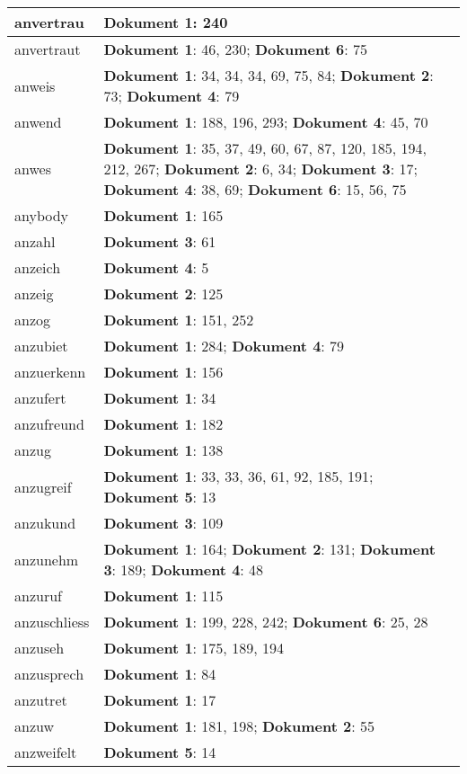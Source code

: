 \documentclass[a5paper]{article}
\begin{document}
\begin{longtable}[l]{|l|p{3in}|}
\hline
anvertrau & \textbf{Dokument 1}: 240 \\
\hline
anvertraut & \textbf{Dokument 1}: 46, 230; \textbf{Dokument 6}: 75 \\
\hline
anweis & \textbf{Dokument 1}: 34, 34, 34, 69, 75, 84; \textbf{Dokument 2}: 73; \textbf{Dokument 4}: 79 \\
\hline
anwend & \textbf{Dokument 1}: 188, 196, 293; \textbf{Dokument 4}: 45, 70 \\
\hline
anwes & \textbf{Dokument 1}: 35, 37, 49, 60, 67, 87, 120, 185, 194, 212, 267; \textbf{Dokument 2}: 6, 34; \textbf{Dokument 3}: 17; \textbf{Dokument 4}: 38, 69; \textbf{Dokument 6}: 15, 56, 75 \\
\hline
anybody & \textbf{Dokument 1}: 165 \\
\hline
anzahl & \textbf{Dokument 3}: 61 \\
\hline
anzeich & \textbf{Dokument 4}: 5 \\
\hline
anzeig & \textbf{Dokument 2}: 125 \\
\hline
anzog & \textbf{Dokument 1}: 151, 252 \\
\hline
anzubiet & \textbf{Dokument 1}: 284; \textbf{Dokument 4}: 79 \\
\hline
anzuerkenn & \textbf{Dokument 1}: 156 \\
\hline
anzufert & \textbf{Dokument 1}: 34 \\
\hline
anzufreund & \textbf{Dokument 1}: 182 \\
\hline
anzug & \textbf{Dokument 1}: 138 \\
\hline
anzugreif & \textbf{Dokument 1}: 33, 33, 36, 61, 92, 185, 191; \textbf{Dokument 5}: 13 \\
\hline
anzukund & \textbf{Dokument 3}: 109 \\
\hline
anzunehm & \textbf{Dokument 1}: 164; \textbf{Dokument 2}: 131; \textbf{Dokument 3}: 189; \textbf{Dokument 4}: 48 \\
\hline
anzuruf & \textbf{Dokument 1}: 115 \\
\hline
anzuschliess & \textbf{Dokument 1}: 199, 228, 242; \textbf{Dokument 6}: 25, 28 \\
\hline
anzuseh & \textbf{Dokument 1}: 175, 189, 194 \\
\hline
anzusprech & \textbf{Dokument 1}: 84 \\
\hline
anzutret & \textbf{Dokument 1}: 17 \\
\hline
anzuw & \textbf{Dokument 1}: 181, 198; \textbf{Dokument 2}: 55 \\
\hline
anzweifelt & \textbf{Dokument 5}: 14 \\

\end{longtable}
\end{document}
